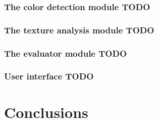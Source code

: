 \documentclass[12pt]{report}
\begin{document}
	\subsection{The color detection module TODO}
	
	\subsection{The texture analysis module TODO}
	
	\subsection{The evaluator module TODO}
	
	\subsection{User interface TODO}
	

	
	\chapter{Conclusions}
	
	\newpage
	
	
\end{document}
